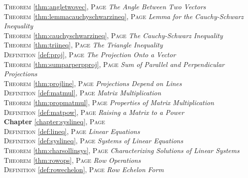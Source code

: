 \begin{multicols}{2}
{         \textsc{Theorem} \ref{thm:angletwovec}, \textsc{Page} \pageref{thm:angletwovec} \textit{The Angle Between Two Vectors} \\
         \textsc{Theorem} \ref{thm:lemmacauchyschwarzineq}, \textsc{Page} \pageref{thm:lemmacauchyschwarzineq} \textit{Lemma for the Cauchy-Schwarz Inequality} \\
         \textsc{Theorem} \ref{thm:cauchyschwarzineq}, \textsc{Page} \pageref{thm:cauchyschwarzineq} \textit{The Cauchy-Schwarz Inequality} \\
         \textsc{Theorem} \ref{thm:triineq}, \textsc{Page} \pageref{thm:triineq} \textit{The Triangle Inequality} \\
         \textsc{Definition} \ref{def:proj}, \textsc{Page} \pageref{def:proj} \textit{The Projection Onto a Vector} \\
         \textsc{Theorem} \ref{thm:sumparperpproj}, \textsc{Page} \pageref{thm:sumparperpproj} \textit{Sum of Parallel and Perpendicular Projections} \\
         \textsc{Theorem} \ref{thm:projline}, \textsc{Page} \pageref{thm:projline} \textit{Projections Depend on Lines} \\
         \textsc{Definition} \ref{def:matmul}, \textsc{Page} \pageref{def:matmul} \textit{Matrix Multiplication} \\
         \textsc{Theorem} \ref{thm:propmatmul}, \textsc{Page} \pageref{thm:propmatmul} \textit{Properties of Matrix Multiplication} \\
         \textsc{Definition} \ref{def:matpow}, \textsc{Page} \pageref{def:matpow} \textit{Raising a Matrix to a Power} \\
         \textbf{Chapter} \ref{chapter:syslineq}, \textsc{Page} \pageref{chapter:syslineq} \\
         \textsc{Definition} \ref{def:lineq}, \textsc{Page} \pageref{def:lineq} \textit{Linear Equations} \\
         \textsc{Definition} \ref{def:syslineq}, \textsc{Page} \pageref{def:syslineq} \textit{Systems of Linear Equations} \\
         \textsc{Theorem} \ref{thm:charsollinsys}, \textsc{Page} \pageref{thm:charsollinsys} \textit{Characterizing Solutions of Linear Systems} \\
         \textsc{Theorem} \ref{thm:rowops}, \textsc{Page} \pageref{thm:rowops} \textit{Row Operations} \\
         \textsc{Definition} \ref{def:rowechelon}, \textsc{Page} \pageref{def:rowechelon} \textit{Row Echelon Form} \\
}
\end{multicols}
